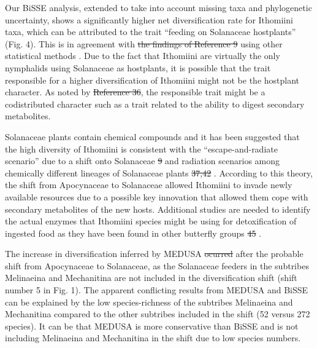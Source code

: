 \documentclass[10pt]{article}
\providecommand{\DIFaddtex}[1]{{\protect\color{blue}\uwave{#1}}} %
\providecommand{\DIFdeltex}[1]{{\protect\color{red}\sout{#1}}}                      %
\providecommand{\DIFaddbegin}{} %
\providecommand{\DIFaddend}{} %
\providecommand{\DIFdelbegin}{} %
\providecommand{\DIFdelend}{} %
\providecommand{\DIFadd}[1]{\texorpdfstring{\DIFaddtex{#1}}{#1}} %
\providecommand{\DIFdel}[1]{\texorpdfstring{\DIFdeltex{#1}}{}} %
\begin{document}
Our BiSSE analysis, extended to take into account missing taxa and
phylogenetic uncertainty, shows a significantly higher net
diversification rate for Ithomiini taxa, which can be attributed to the
trait ``feeding on Solanaceae hostplants'' (Fig. 4). This is in
agreement with \DIFdelbegin \DIFdel{the findings of Reference 9 }\DIFdelend \DIFaddbegin \DIFadd{previous findings }\DIFaddend using other statistical methods
\DIFaddbegin \DIFadd{\mbox{%
\cite{fordyce2010}
}%
}\DIFaddend . Due to the fact that Ithomiini are virtually the only
nymphalids using Solanaceae as hostplants, it is possible that the trait
responsible for a higher diversification of Ithomiini might not be the
hostplant character. As noted by \DIFdelbegin \DIFdel{Reference 36}\DIFdelend \DIFaddbegin \DIFadd{Maddison et al. (2007) \mbox{%
\cite{maddison2007}
}%
}\DIFaddend ,
the responsible trait might be a codistributed character such as a trait
related to the ability to digest secondary metabolites.

Solanaceae plants contain chemical compounds and it has been suggested
that the high diversity of Ithomiini is consistent with the
``escape-and-radiate scenario'' due to a shift onto Solanaceae 
\DIFdelbegin %
\DIFdel{9}%
\DIFdelend \DIFaddbegin \DIFadd{\mbox{%
\cite{fordyce2010}
}%
}\DIFaddend and radiation scenarios among chemically different lineages of
Solanaceae plants \DIFdelbegin %
\DIFdel{37,42}%
\DIFdelend \DIFaddbegin \DIFadd{\mbox{%
\cite{willmott2006,brown1987}
}%
}\DIFaddend .
According to this theory, the shift from
Apocynaceae to Solanaceae allowed Ithomiini to invade newly available
resources due to a possible key innovation that allowed them cope with
secondary metabolites of the new hosts. Additional studies are needed to
identify the actual enzymes that Ithomiini species might be using for
detoxification of ingested food as they have been found in other
butterfly groups \DIFdelbegin %
\DIFdel{45}%
\DIFdelend \DIFaddbegin \DIFadd{\mbox{%
\cite{wheat2007}
}%
}\DIFaddend .

The increase in diversification inferred by MEDUSA \DIFdelbegin \DIFdel{ocurred }\DIFdelend \DIFaddbegin \DIFadd{occurred }\DIFaddend after the
probable shift from Apocynaceae to Solanaceae, as the Solanaceae feeders
in the subtribes Melinaeina and Mechanitina are not included in the
diversification shift (shift number 5 in Fig. 1). The apparent
conflicting results from MEDUSA and BiSSE can be explained by the low
species-richness of the subtribes Melinaeina and Mechanitina compared to
the other subtribes included in the shift (52 versus 272 species). It
can be that MEDUSA is more conservative than BiSSE and is not including
Melinaeina and Mechanitina in the shift due to low species numbers.
\end{document}
